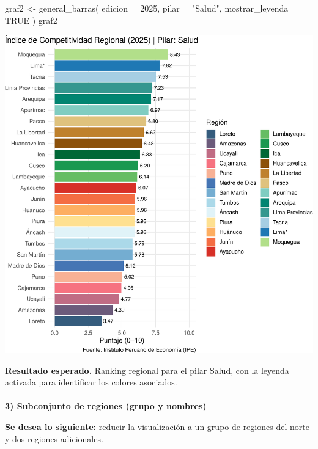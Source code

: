 \documentclass[
  11pt,
  letterpaper,
  DIV=11,
  numbers=noendperiod]{scrartcl}
\makeatletter
\let\oldparagraph\paragraph
\renewcommand{\paragraph}{
    \@ifstar
      \xxxParagraphStar
      \xxxParagraphNoStar
  }
\newcommand{\xxxParagraphStar}[1]{\oldparagraph*{#1}\mbox{}}
\newcommand{\xxxParagraphNoStar}[1]{\oldparagraph{#1}\mbox{}}
\newenvironment{Shaded}{\begin{snugshade}}{\end{snugshade}}
\newcommand{\AttributeTok}[1]{\textcolor[rgb]{0.40,0.45,0.13}{#1}}
\newcommand{\ConstantTok}[1]{\textcolor[rgb]{0.56,0.35,0.01}{#1}}
\newcommand{\DecValTok}[1]{\textcolor[rgb]{0.68,0.00,0.00}{#1}}
\newcommand{\FunctionTok}[1]{\textcolor[rgb]{0.28,0.35,0.67}{#1}}
\newcommand{\NormalTok}[1]{\textcolor[rgb]{0.00,0.23,0.31}{#1}}
\newcommand{\OtherTok}[1]{\textcolor[rgb]{0.00,0.23,0.31}{#1}}
\newcommand{\StringTok}[1]{\textcolor[rgb]{0.13,0.47,0.30}{#1}}
\makeatother
\begin{document}
\begin{Shaded}
\begin{Highlighting}[]
\NormalTok{graf2 }\OtherTok{\textless{}{-}} \FunctionTok{general\_barras}\NormalTok{(}
  \AttributeTok{edicion =} \DecValTok{2025}\NormalTok{,}
  \AttributeTok{pilar =} \StringTok{"Salud"}\NormalTok{,}
  \AttributeTok{mostrar\_leyenda =} \ConstantTok{TRUE}
\NormalTok{)}
\NormalTok{graf2}
\end{Highlighting}
\end{Shaded}

\includegraphics{Manual_files/figure-pdf/unnamed-chunk-17-1.pdf}

\textbf{Resultado esperado.} Ranking regional para el pilar Salud, con
la leyenda activada para identificar los colores asociados.

\paragraph{\texorpdfstring{\textbf{3) Subconjunto de regiones (grupo y
nombres)}}{3) Subconjunto de regiones (grupo y nombres)}}\label{subconjunto-de-regiones-grupo-y-nombres}

\textbf{Se desea lo siguiente:} reducir la visualización a un grupo de
regiones del norte y dos regiones adicionales.
\end{document}
